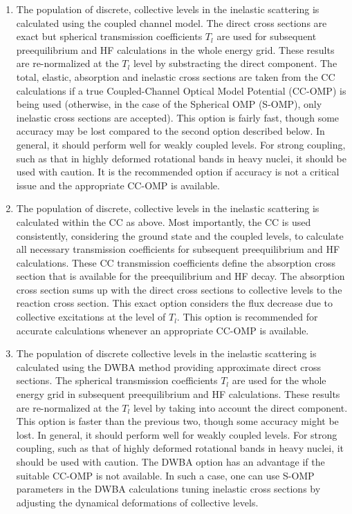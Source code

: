 \begin{enumerate}
\item The population of discrete, collective levels in the inelastic
scattering is calculated using the coupled channel model. The direct cross
sections are exact but spherical transmission coefficients $T_{l}$ are used
for subsequent preequilibrium and HF calculations in the whole energy grid.
These results are re-normalized at the $T_{l}$ level by substracting
the direct component. The total, elastic, absorption and inelastic cross
sections are taken from the CC calculations if a true Coupled-Channel
Optical Model Potential (CC-OMP) is being used (otherwise, in the case of
the Spherical OMP (S-OMP), only inelastic cross sections are accepted). This
option is fairly fast, though some accuracy may be lost compared to the
second option described below. In general, it should perform well for weakly
coupled levels. For strong coupling, such as that in highly deformed
rotational bands in heavy nuclei, it should be used with caution. It is the
recommended option if accuracy is not a critical issue and the appropriate
CC-OMP is available.

\item The population of discrete, collective levels in the inelastic
scattering is calculated within the CC as above. Most importantly, the CC is
used consistently, considering the ground state and the coupled levels, to
calculate all necessary transmission coefficients for subsequent
preequilibrium and HF calculations. These CC transmission coefficients
define the absorption cross section that is available for the preequilibrium
and HF decay. The absorption cross section sums up with the direct cross
sections to collective levels to the reaction cross section. This exact
option considers the flux decrease due to collective excitations at the
level of $T_{l}$. This option is recommended for accurate calculations
whenever an appropriate CC-OMP is available.

\item The population of discrete collective levels in the inelastic
scattering is calculated using the DWBA method providing approximate direct
cross sections. The spherical transmission coefficients $T_{l}$ are used for
the whole energy grid in subsequent preequilibrium and HF calculations.
These results are re-normalized at the $T_{l}$ level by taking into account
the direct component. This option is faster than the previous two, though
some accuracy might be lost. In general, it should perform well for weakly
coupled levels. For strong coupling, such as that of highly deformed
rotational bands in heavy nuclei, it should be used with caution. The DWBA
option has an advantage if the suitable CC-OMP is not available. In such a
case, one can use S-OMP parameters in the DWBA calculations tuning inelastic
cross sections by adjusting the dynamical deformations of collective levels.
\end{enumerate}

